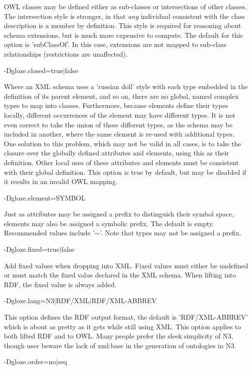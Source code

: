 OWL classes may be defined either as sub-\/classes or intersections of other classes. The intersection style is stronger, in that {\itshape any\/} individual consistent with the class description is a member by definition. This style is required for reasoning about schema extensions, but is much more expensive to compute. The default for this option is 'subClassOf'. In this case, extensions are not mapped to sub-\/class relationships (restrictions are unaffected).

{\ttfamily -\/Dgloze.closed=true$|$false}

Where an XML schema uses a 'russian doll' style with each type embedded in the definition of its parent element, and so on, there are no global, named complex types to map into classes. Furthermore, because elements define their types locally, different occurrences of the element may have different types. It is not even correct to take the union of these different types, as the schema may be included in another, where the same element is re-\/used with additional types. One solution to this problem, which may not be valid in all cases, is to take the closure over the globally defined attributes and elements, using this as their definition. Other local uses of these attributes and elements must be consistent with their global definition. This option is true by default, but may be disabled if it results in an invalid OWL mapping.

{\ttfamily -\/Dgloze.element=SYMBOL}

Just as attributes may be assigned a prefix to distinguish their symbol space, elements may also be assigned a symbolic prefix. The default is empty. Recommended values include '$\sim$'. Note that types may not be assigned a prefix.

{\ttfamily -\/Dgloze.fixed=true$|$false}

Add fixed values when dropping into XML. Fixed values must either be undefined or must match the fixed value declared in the XML schema. When lifting into RDF, the fixed value is always added.

{\ttfamily -\/Dgloze.lang=N3$|$RDF/XML$|$RDF/XML-\/ABBREV}

This option defines the RDF output format, the default is 'RDF/XML-\/ABBREV' which is about as pretty as it gets while still using XML. This option applies to both lifted RDF and to OWL. Many people prefer the sleek simplicity of N3, though user beware the lack of xml:base in the generation of ontologies in N3.

{\ttfamily -\/Dgloze.order=no$|$seq}

